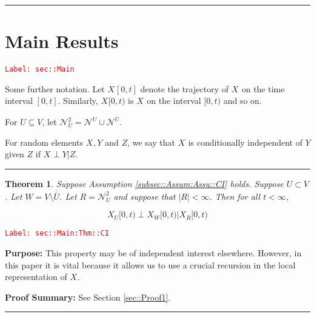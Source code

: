 \documentclass[12pt]{article}
\newcommand{\mc}{\mathcal}
\newcommand{\ov}{\overline}
\newcommand{\tr}{\textcolor{red}}
\newcommand{\labe}[1]{\tr{\texttt{Label: #1}}}
\newcommand{\purpose}{\textbf{Purpose: }}
\newcommand{\pfsum}{\textbf{Proof Summary: }}
\newcommand{\ind}{\hspace{24pt}}
\newcommand{\lin}{\rule{\linewidth}{0.4 pt}}
\renewcommand{\U}{U}							%
\newcommand{\UU}{W}								%
\newcommand{\UUU}{R}							%
\renewcommand{\t}{t}							%
\newcommand{\X}{X}								%
\newcommand{\neigh}{\mc{N}}						%
\newcommand{\dneigh}{\mc{N}^2}					%
\newcommand{\vind}[1]{^{#1}}					%
\newcommand{\cind}[1]{_{#1}}					%
\newcommand{\tip}[1]{#1}						%
\newcommand{\dnvind}[1]{_{#1}}					%
\newcommand{\XX}{Y}								%
\newcommand{\XXX}{Z}							%
\newtheorem{thms}{Theorem}[section]
\begin{document}
\lin
\section{Main Results}
\label{sec::Main}\labe{sec::Main}

Some further notation. Let \(\X\cind{}\tip{[0,\t]}\) denote the trajectory of \(\X\cind{}\tip{}\) on the time interval \([0,\t]\). Similarly, \(\X\cind{}\tip{[0,\t)}\) is \(\X\cind{}\tip{}\) on the interval \([0,\t)\) and so on.

\ind For \(\U \subseteq V\), let \(\dneigh\dnvind{\U} = \neigh\vind{\U} \cup \neigh\vind{\ov{\U}}\). 

\ind For random elements \(\X\cind{}\tip{},\XX{}{}\) and \(\XXX{}{}\), we say that \(\X\cind{}\tip{}\) is conditionally independent of \(\XX{}{}\) given \(\XXX{}{}\) if \(\X\cind{}\tip{}\perp\XX{}{}|\XXX{}{}\).

\lin

\begin{thms}
Suppose Assumption \ref{subsec::Assum:Assu::CI} holds. Suppose \(\U \subset V\). Let \(\UU =V\setminus \ov{\ov{\U}}\). Let \(\UUU= \dneigh\dnvind{U}\) and suppose that \(|\UUU| < \infty\). Then for all \(\t < \infty\),

\[\X\cind{\U}\tip{[0,\t)}\perp \X\cind{\UU}\tip{[0,\t)}|\X\cind{\UUU}\tip{[0,\t)}\]
\label{sec::Main:Thm::CI}
\end{thms}
\labe{sec::Main:Thm::CI}

\purpose This property may be of independent interest elsewhere. However, in this paper it is vital because it allows us to use a crucial recursion in the local representation of \(\X\cind{}\tip{}\).

\pfsum See Section \ref{sec::Proof1}.

\lin
\end{document}
